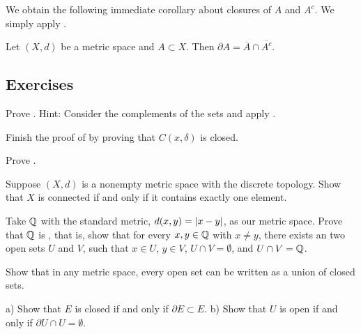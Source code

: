 We obtain the following immediate corollary about closures of $A$ and $A^c$.  We
simply apply .

\begin{cor}
Let $(X,d)$ be a metric space and $A \subset X$.
Then $\partial A = \overline{A} \cap \overline{A^c}$.
\end{cor}

\subsection{Exercises}

\begin{exercise}
Prove .  Hint: Consider the complements of the
sets and apply .
\end{exercise}

\begin{exercise}
Finish the proof of  by
proving that $C(x,\delta)$ is closed.
\end{exercise}

\begin{exercise}
Prove .
\end{exercise}

\begin{exercise}
Suppose $(X,d)$ is a nonempty metric space with the discrete topology.  Show
that $X$ is connected if and only if it contains exactly one element.
\end{exercise}

\begin{exercise}
Take ${\mathbb{Q}}$ with the standard metric, $d(x,y) = \left\lvert {x-y} \right\rvert$, as our metric space.  Prove that ${\mathbb{Q}}$ is
\emph{}, that is, show 
that for every $x, y \in {\mathbb{Q}}$ with $x \not= y$, there exists an
two open sets $U$ and $V$, such that $x \in U$, $y \in V$,
$U \cap V = \emptyset$, and $U \cap V = {\mathbb{Q}}$.
\end{exercise}

\begin{exercise}
Show that in any metric space,
every open set can be written as a union of closed sets.
\end{exercise}

\begin{exercise}
a) Show that $E$ is closed if and only if $\partial E \subset E$.
b) Show that $U$ is open if and only if $\partial U \cap U = \emptyset$.
\end{exercise}

